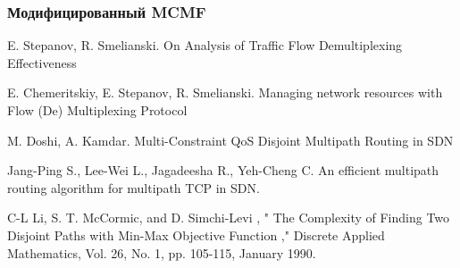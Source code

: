 \documentclass[a4paper]{article}
\begin{document}
\subsubsection{Модифицированный MCMF \cite{stepsmel}}





\newpage
\begin{thebibliography}{5}
E. Stepanov, R. Smelianski. On Analysis of Traffic Flow Demultiplexing Effectiveness

E. Chemeritskiy, E. Stepanov, R. Smelianski. Managing network resources with Flow (De) Multiplexing Protocol

M. Doshi, A. Kamdar. Multi-Constraint QoS Disjoint Multipath Routing in SDN

Jang-Ping S., Lee-Wei L., Jagadeesha R., Yeh-Cheng C. An efficient multipath routing algorithm for multipath TCP in SDN.

C-L Li, S. T. McCormic, and D. Simchi-Levi , " The Complexity of
Finding Two Disjoint Paths with Min-Max Objective Function ,"
Discrete Applied Mathematics, Vol. 26, No. 1, pp. 105-115, January
1990.
\end{thebibliography}
\end{document}

